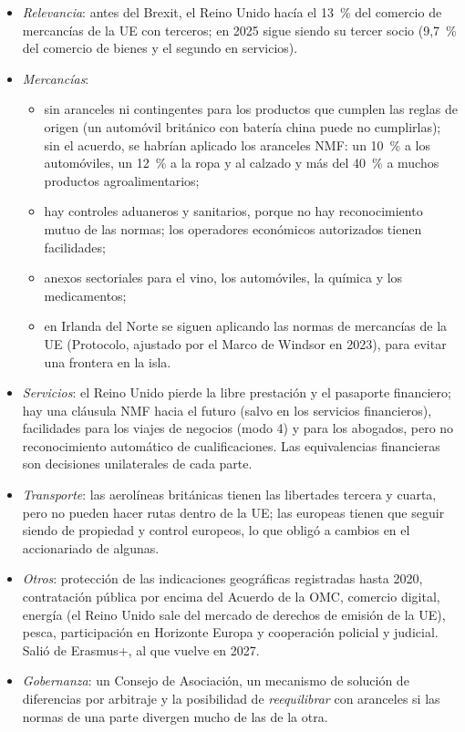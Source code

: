 \documentclass[11pt]{article}
\begin{document}
\begin{itemize}
\item \emph{Relevancia}: antes del Brexit, el Reino Unido hacía el 13~\% del comercio de mercancías de la UE con terceros; en 2025 sigue siendo su tercer socio (9,7~\% del comercio de bienes y el segundo en servicios)\nocite{Eurostat2026Socios}.
\item \emph{Mercancías}:
  \begin{itemize}
  \item sin aranceles ni contingentes para los productos que cumplen las reglas de origen (un automóvil británico con batería china puede no cumplirlas); sin el acuerdo, se habrían aplicado los aranceles NMF: un 10~\% a los automóviles, un 12~\% a la ropa y al calzado y más del 40~\% a muchos productos agroalimentarios;
  \item hay controles aduaneros y sanitarios, porque no hay reconocimiento mutuo de las normas; los operadores económicos autorizados tienen facilidades;
  \item anexos sectoriales para el vino, los automóviles, la química y los medicamentos;
  \item en Irlanda del Norte se siguen aplicando las normas de mercancías de la UE (Protocolo, ajustado por el Marco de Windsor en 2023), para evitar una frontera en la isla.
  \end{itemize}
\item \emph{Servicios}: el Reino Unido pierde la libre prestación y el pasaporte financiero; hay una cláusula NMF hacia el futuro (salvo en los servicios financieros), facilidades para los viajes de negocios (modo 4) y para los abogados, pero no reconocimiento automático de cualificaciones. Las equivalencias financieras son decisiones unilaterales de cada parte.
\item \emph{Transporte}: las aerolíneas británicas tienen las libertades tercera y cuarta, pero no pueden hacer rutas dentro de la UE; las europeas tienen que seguir siendo de propiedad y control europeos, lo que obligó a cambios en el accionariado de algunas.
\item \emph{Otros}: protección de las indicaciones geográficas registradas hasta 2020, contratación pública por encima del Acuerdo de la OMC, comercio digital, energía (el Reino Unido sale del mercado de derechos de emisión de la UE), pesca, participación en Horizonte Europa y cooperación policial y judicial. Salió de Erasmus+, al que vuelve en 2027.
\item \emph{Gobernanza}: un Consejo de Asociación, un mecanismo de solución de diferencias por arbitraje y la posibilidad de \emph{reequilibrar} con aranceles si las normas de una parte divergen mucho de las de la otra.
\end{itemize}
\end{document}
